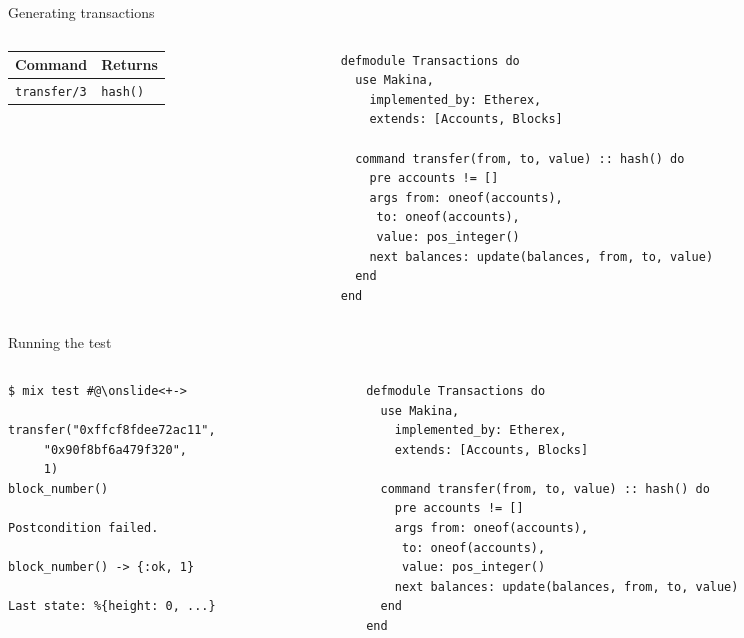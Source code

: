 \documentclass[aspectratio=169, 10pt, handout]{beamer}
\begin{document}
\begin{frame}[label={sec:org7f823e6},fragile]{Generating transactions}
 \begin{columns}
\begin{column}{0.44\columnwidth}
\onslide<+->
\begin{center}
\begin{tabular}{ll}
Command & Returns\\
\hline
\texttt{transfer/3} & \texttt{hash()}\\
\end{tabular}
\end{center}
\end{column}
\begin{column}{0.52\columnwidth}
\onslide<+->
\lstset{language=elixir,label= ,caption= ,captionpos=b,numbers=none,style=display}
\begin{lstlisting}
defmodule Transactions do
  use Makina,
    implemented_by: Etherex,
    extends: [Accounts, Blocks]

  command transfer(from, to, value) :: hash() do
    pre accounts != []
    args from: oneof(accounts),
	 to: oneof(accounts),
	 value: pos_integer()
    next balances: update(balances, from, to, value)
  end
end
\end{lstlisting}
\end{column}
\end{columns}
\end{frame}

\begin{frame}[label={sec:orgf92c75f},fragile]{Running the test}
 \begin{columns}
\begin{column}{0.44\columnwidth}
\lstset{language=bash,label= ,caption= ,captionpos=b,numbers=none,style=shell}
\begin{lstlisting}
$ mix test #@\onslide<+->

transfer("0xffcf8fdee72ac11",
	 "0x90f8bf6a479f320",
	 1)
block_number()

Postcondition failed.

block_number() -> {:ok, 1}

Last state: %{height: 0, ...}
\end{lstlisting}
\end{column}

\begin{column}{0.52\columnwidth}
\onslide<+->
\lstset{language=elixir,label= ,caption= ,captionpos=b,numbers=none,style=display}
\begin{lstlisting}
defmodule Transactions do
  use Makina,
    implemented_by: Etherex,
    extends: [Accounts, Blocks]

  command transfer(from, to, value) :: hash() do
    pre accounts != []
    args from: oneof(accounts),
	 to: oneof(accounts),
	 value: pos_integer()
    next balances: update(balances, from, to, value)
  end
end
\end{lstlisting}
\end{column}
\end{columns}
\end{frame}
\end{document}
